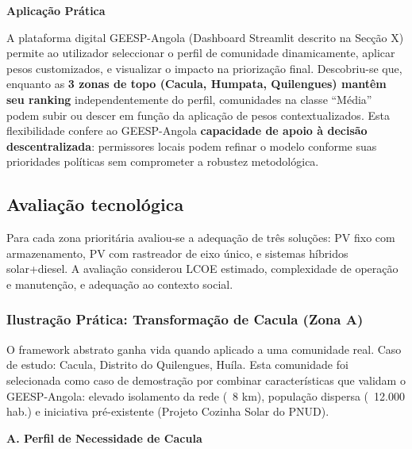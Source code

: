 \documentclass[12pt, a4paper]{article}
\begin{document}
\textbf{Aplicação Prática}

A plataforma digital GEESP-Angola (Dashboard Streamlit descrito na Secção X) permite 
ao utilizador seleccionar o perfil de comunidade dinamicamente, aplicar pesos customizados, 
e visualizar o impacto na priorização final. Descobriu-se que, enquanto as \textbf{3 zonas 
de topo (Cacula, Humpata, Quilengues) mantêm seu ranking} independentemente do perfil, 
comunidades na classe ``Média'' podem subir ou descer em função da aplicação de pesos 
contextualizados. Esta flexibilidade confere ao GEESP-Angola \textbf{capacidade de apoio 
à decisão descentralizada}: permissores locais podem refinar o modelo conforme suas 
prioridades políticas sem comprometer a robustez metodológica.

\subsection{Avaliação tecnológica}

Para cada zona prioritária avaliou-se a adequação de três soluções: PV fixo com armazenamento, PV com rastreador de eixo único, e sistemas híbridos solar+diesel. A avaliação considerou LCOE estimado, complexidade de operação e manutenção, e adequação ao contexto social.

\subsubsection{Ilustração Prática: Transformação de Cacula (Zona A)}

O framework abstrato ganha vida quando aplicado a uma comunidade real. Caso de estudo: 
Cacula, Distrito do Quilengues, Huíla. Esta comunidade foi selecionada como caso de 
demostração por combinar características que validam o GEESP-Angola: elevado isolamento 
da rede (~8 km), população dispersa (~12.000 hab.) e iniciativa pré-existente (Projeto 
Cozinha Solar do PNUD).

\textbf{A. Perfil de Necessidade de Cacula}
\end{document}
